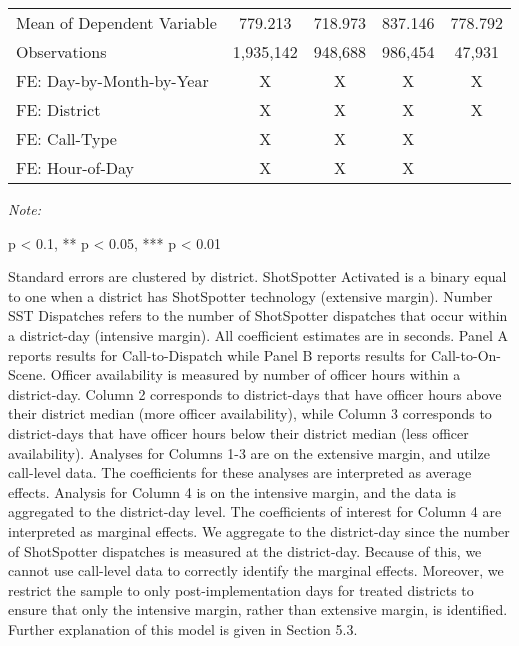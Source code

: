 \begin{table}[H]
\begin{threeparttable}
\begin{tabular}[t]{lcccc}
\hspace{1em}Mean of Dependent Variable & 779.213 & 718.973 & 837.146 & 778.792\\
\hspace{1em}Observations & 1,935,142 & 948,688 & 986,454 & 47,931\\
\midrule
FE: Day-by-Month-by-Year & X & X & X & X\\
FE: District & X & X & X & X\\
FE: Call-Type & X & X & X & \\
FE: Hour-of-Day & X & X & X & \\
\bottomrule
\end{tabular}
\begin{tablenotes}
\item \textit{Note: } 
\item * p < 0.1, ** p < 0.05, *** p < 0.01
\item Standard errors are clustered by district.                       ShotSpotter Activated is a binary equal to one when                      a district has ShotSpotter technology (extensive margin).                      Number SST Dispatches refers to the number of                      ShotSpotter dispatches that occur within a district-day (intensive margin).                      All coefficient estimates are in seconds. Panel A reports results for                      Call-to-Dispatch while Panel B reports results for Call-to-On-Scene.                      Officer availability is measured by number of officer hours within a district-day.                       Column 2 corresponds to district-days that have officer hours above                      their district median (more officer availability), while Column 3 corresponds to district-days that                      have officer hours below their district median (less officer availability). Analyses for                       Columns 1-3 are on the extensive margin, and utilze call-level data. The coefficients for these analyses                      are interpreted as average effects. Analysis for Column 4                      is on the intensive margin, and the data is aggregated to the district-day level. The                      coefficients of interest for Column 4 are interpreted as marginal effects. We                      aggregate to the district-day since the number of ShotSpotter dispatches is measured                      at the district-day. Because of this, we                      cannot use call-level data to correctly identify the marginal effects. Moreover,                      we restrict the sample to only post-implementation days for treated districts to                      ensure that only the intensive margin, rather than extensive margin, is identified. Further explanation                       of this model is                      given in Section 5.3.                   
\end{tablenotes}
\end{threeparttable}
\end{table}
